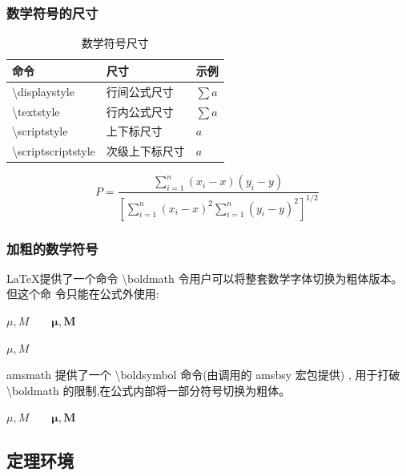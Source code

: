 \documentclass[a4paper]{ctexart}
\begin{document}
    \subsubsection{数学符号的尺寸}
    \begin{table}[H]
        \centering
        \caption{数学符号尺寸}
        \begin{tabular}{lll}
            \toprule
            命令 &尺寸 &示例\\
            \midrule
            \textbackslash displaystyle         & 行间公式尺寸      & $\displaystyle \sum a$    \\
            \textbackslash textstyle            & 行内公式尺寸      & $\textstyle \sum a$       \\
            \textbackslash scriptstyle          & 上下标尺寸        & $\scriptstyle a$          \\
            \textbackslash scriptscriptstyle    & 次级上下标尺寸    & $\scriptscriptstyle a$    \\
            \bottomrule
        \end{tabular}
    \end{table}
    \[
        P = \frac
            {\sum_{i = 1}^n (x_i - x)(y_i - y)}
            {\displaystyle \left[
                \sum_{i = 1}^n (x_i - x)^2
                \sum_{i = 1}^n (y_i - y)^2
            \right]^{1/2}}\,   
    \]
    \subsubsection{加粗的数学符号}
    \LaTeX 提供了一个命令 \textbackslash boldmath 令用户可以将整套数学字体切换为粗体版本。但这个命 令只能在公式外使用:\par
    $\mu, M \qquad \mathbf{\mu}, \mathbf{M}$ \qquad
    {\boldmath$\mu, M$\par}
    amsmath 提供了一个 \textbackslash boldsymbol 命令(由调用的 amsbsy 宏包提供) ,%
    用于打破 \textbackslash boldmath 的限制,在公式内部将一部分符号切换为粗体。\par
    $\mu, M \qquad \boldsymbol{\mu}, \boldsymbol{M}$
    \subsection{定理环境}
\end{document}
